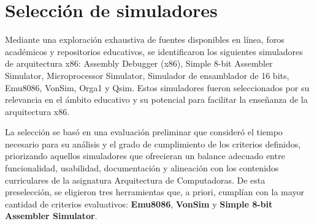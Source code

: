 \documentclass[12pt,oneside]{templates/unerthesis}
\begin{document}
\hypertarget{selecciuxf3n-de-simuladores}{%
\section{Selección de simuladores}\label{selecciuxf3n-de-simuladores}}

Mediante una exploración exhaustiva de fuentes disponibles en línea, foros académicos y repositorios educativos, se identificaron los siguientes simuladores de arquitectura x86: Assembly Debugger (x86), Simple 8-bit Assembler Simulator, Microprocessor Simulator, Simulador de ensamblador de 16 bits, Emu8086, VonSim, Orga1 y Qsim. Estos simuladores fueron seleccionados por su relevancia en el ámbito educativo y su potencial para facilitar la enseñanza de la arquitectura x86.

La selección se basó en una evaluación preliminar que consideró el tiempo necesario para su análisis y el grado de cumplimiento de los criterios definidos, priorizando aquellos simuladores que ofrecieran un balance adecuado entre funcionalidad, usabilidad, documentación y alineación con los contenidos curriculares de la asignatura Arquitectura de Computadoras. De esta preselección, se eligieron tres herramientas que, a priori, cumplían con la mayor cantidad de criterios evaluativos: \textbf{Emu8086}, \textbf{VonSim} y \textbf{Simple 8-bit Assembler Simulator}.

\begin{table}[!h]
\centering
\caption{\label{tab:simuladores}Proceso de selección de simuladores}
\centering
{}
\end{table}
\end{document}
